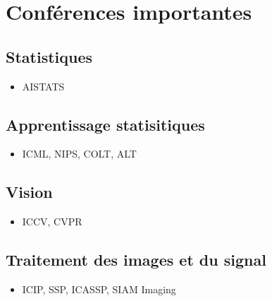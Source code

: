 \section{Conférences importantes}



\subsection{Statistiques}

\begin{itemize}
 \item AISTATS
\end{itemize}

\subsection{Apprentissage statisitiques}
\begin{itemize}
 \item ICML, NIPS, COLT, ALT
\end{itemize}
\subsection{Vision}

\begin{itemize}
 \item ICCV, CVPR 
\end{itemize}


\subsection{Traitement des images et du signal}

\begin{itemize}
 \item ICIP, SSP, ICASSP, SIAM Imaging
\end{itemize}


